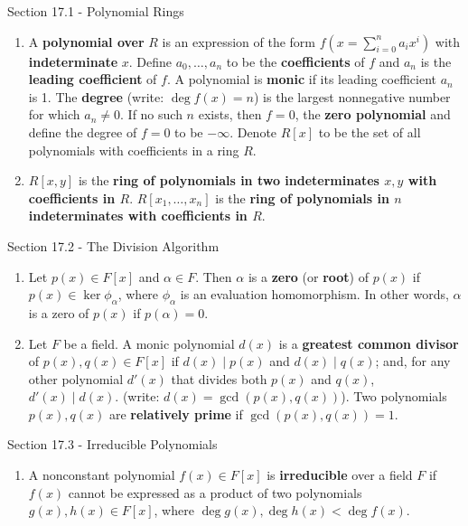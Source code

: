 \documentclass[12pt]{article}
\theoremstyle{definition}
\theoremstyle{named}
\begin{document}
\begin{section}{Section 17.1 - Polynomial Rings}
    \begin{enumerate}
        \item A \textbf{polynomial over} $R$ is an expression of the form $f(x = \sum_{i=0}^{n}a_ix^i)$ with \textbf{indeterminate} $x$. Define $a_0,\dots,a_n$ to be the \textbf{coefficients} of $f$ and $a_n$ is the \textbf{leading coefficient} of $f$. A polynomial is \textbf{monic} if its leading coefficient $a_n$ is 1. The \textbf{degree} (write: $\deg f(x) = n$) is the largest nonnegative number for which $a_n \neq 0$. If no such $n$ exists, then $f=0$, the \textbf{zero polynomial} and define the degree of $f=0$ to be $-\infty$. Denote $R[x]$ to be the set of all polynomials with coefficients in a ring $R$. 
        \item $R[x,y]$ is the \textbf{ring of polynomials in two indeterminates $x,y$ with coefficients in $R$}. $R[x_1,\dots,x_n]$ is the \textbf{ring of polynomials in $n$ indeterminates with coefficients in $R$}. 
    \end{enumerate}
\end{section}

\begin{section}{Section 17.2 - The Division Algorithm}
    \begin{enumerate}
        \item Let $p(x) \in F[x]$ and $\alpha \in F$. Then $\alpha$ is a \textbf{zero} (or \textbf{root}) of $p(x)$ if $p(x) \in \ker\phi_\alpha$, where $\phi_\alpha$ is an evaluation homomorphism. In other words, $\alpha$ is a zero of $p(x)$ if $p(\alpha) = 0$. 
        \item Let $F$ be a field. A monic polynomial $d(x)$ is a \textbf{greatest common divisor} of $p(x),q(x) \in F[x]$ if $d(x) \mid p(x)$ and $d(x) \mid q(x)$; and, for any other polynomial $d'(x)$ that divides both $p(x)$ and $q(x)$, $d'(x) \mid d(x)$. (write: $d(x) = \gcd(p(x),q(x))$). Two polynomials $p(x), q(x)$ are \textbf{relatively prime} if $\gcd(p(x),q(x)) = 1$. 
    \end{enumerate}
\end{section}

\begin{section}{Section 17.3 - Irreducible Polynomials}
    \begin{enumerate}
        \item A nonconstant polynomial $f(x) \in F[x]$ is \textbf{irreducible} over a field $F$ if $f(x)$ cannot be expressed as a product of two polynomials $g(x),h(x) \in F[x]$, where $\deg g(x),\deg h(x) < \deg f(x)$. 
    \end{enumerate}
\end{section}
\end{document}
